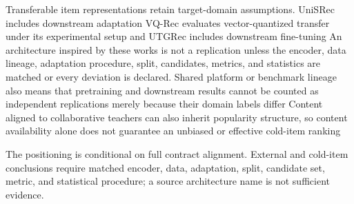 Transferable item representations retain target-domain assumptions. UniSRec
includes downstream adaptation
\cite{hou2022_unisrec} %
VQ-Rec evaluates vector-quantized transfer under its experimental setup
\cite{hou2023_vqrec} %
and UTGRec includes downstream fine-tuning
\cite{zheng2026_utgrec} %
An architecture inspired by these works is not a replication unless the encoder,
data lineage, adaptation procedure, split, candidates, metrics, and statistics
are matched or every deviation is declared. Shared platform or benchmark
lineage also means that pretraining and downstream results cannot be counted as
independent replications merely because their domain labels differ
\cite{meehan2025_cold_popbias} %
\cite{meehan2026_semco} %
Content aligned to collaborative teachers can also inherit popularity structure,
so content availability alone does not guarantee an unbiased or effective
cold-item ranking
\cite{meehan2025_cold_popbias} %

The positioning is conditional on full contract alignment. External and
cold-item conclusions require matched encoder, data, adaptation, split,
candidate set, metric, and statistical procedure; a source architecture name is
not sufficient evidence.


